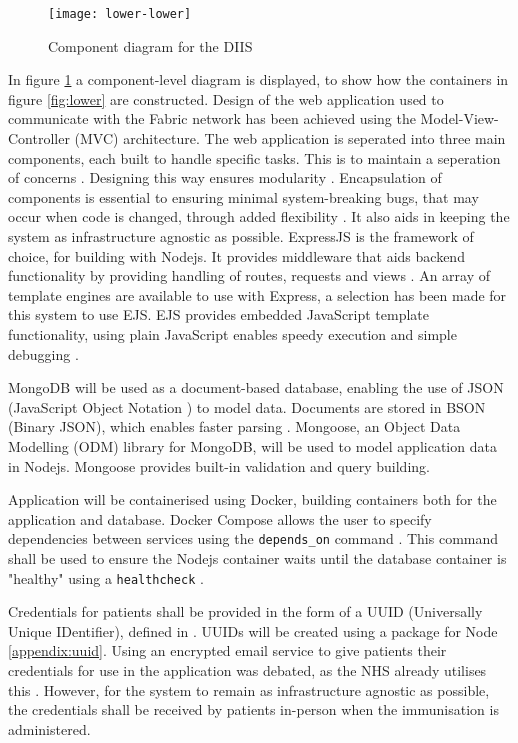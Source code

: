 \begin{figure}[H]
  \texttt{[image: lower-lower]}
  \caption{Component diagram for the DIIS}
  \label{fig:lower-lower}
\end{figure}

In figure \ref{fig:lower-lower} a component-level diagram is displayed, to show how the containers in figure \ref{fig:lower} are constructed. 
Design of the web application used to communicate with the Fabric network has been achieved using the Model-View-Controller (MVC) architecture. 
The web application is seperated into three main components, each built to handle specific tasks. 
This is to maintain a seperation of concerns \cite{richards_software_2015}.
Designing this way ensures modularity \cite{laplante_what_2007}.
Encapsulation of components is essential to ensuring minimal system-breaking bugs, that may occur when code is changed, through added flexibility \cite{application_2001}.
It also aids in keeping the system as infrastructure agnostic as possible.
ExpressJS is the framework of choice, for building with Nodejs. 
It provides middleware that aids backend functionality by providing handling of routes, requests and views \cite{noauthor_express_nodate}.
An array of template engines are available to use with Express, a selection has been made for this system to use EJS.
EJS provides embedded JavaScript template functionality, using plain JavaScript enables speedy execution and simple debugging \cite{noauthor_ejs_nodate}.

MongoDB will be used as a document-based database, enabling the use of JSON (JavaScript Object Notation \cite{noauthor_json_nodate}) to model data. 
Documents are stored in BSON (Binary JSON), which enables faster parsing \cite{noauthor_json_bson_nodate}. 
Mongoose, an Object Data Modelling (ODM) library for MongoDB, will be used to model application data in Nodejs. Mongoose provides built-in validation and query building. \cite{noauthor_mongoose_nodate} 

Application will be containerised using Docker, building containers both for the application and database. 
Docker Compose allows the user to specify dependencies between services using the \lstinline{depends_on} command \cite{noauthor_compose_2021}. 
This command shall be used to ensure the Nodejs container waits until the database container is "healthy" using a \lstinline{healthcheck} \cite{noauthor_compose_2021}.

Credentials for patients shall be provided in the form of a UUID (Universally Unique IDentifier), defined in \cite{noauthor_rfc4122_nodate}.
UUIDs will be created using a package for Node \ref{appendix:uuid}. 
Using an encrypted email service to give patients their credentials for use in the application was debated, as the NHS already utilises this \cite{noauthor_guidance_nodate}. 
However, for the system to remain as infrastructure agnostic as possible, the credentials shall be received by patients in-person when the immunisation is administered.

